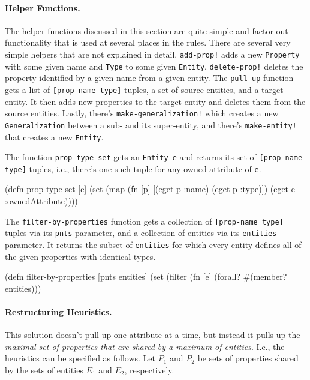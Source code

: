 \documentclass[submission]{eptcs}
\begin{document}
\paragraph{Helper Functions.}

The helper functions discussed in this section are quite simple and factor out
functionality that is used at several places in the rules.  There are several
very simple helpers that are not explained in detail.  \verb|add-prop!| adds a
new \verb|Property| with some given name and \verb|Type| to some given
\verb|Entity|.  \verb|delete-prop!| deletes the property identified by a given
name from a given entity.  The \verb|pull-up| function gets a list of
\verb|[prop-name type]| tuples, a set of source entities, and a target entity.
It then adds new properties to the target entity and deletes them from the
source entities.  Lastly, there's \verb|make-generalization!| which creates a
new \verb|Generalization| between a sub- and its super-entity, and there's
\verb|make-entity!| that creates a new \verb|Entity|.

The function \verb|prop-type-set| gets an \verb|Entity e| and returns its set
of \verb|[prop-name type]| tuples, i.e., there's one such tuple for any owned
attribute of \verb|e|.

\begin{clojurecode}
(defn prop-type-set [e]
  (set (map (fn [p] [(eget p :name) (eget p :type)])
            (eget e :ownedAttribute))))
\end{clojurecode}

The \verb|filter-by-properties| function gets a collection of
\verb|[prop-name type]| tuples via its \verb|pnts| parameter, and a collection
of entities via its \verb|entities| parameter.  It returns the subset of
\verb|entities| for which every entity defines all of the given properties with
identical types.

\begin{clojurecode}
(defn filter-by-properties [pnts entities]
  (set (filter (fn [e] (forall? #(member? %
               entities)))
\end{clojurecode}


\paragraph{Restructuring Heuristics.}

This solution doesn't pull up one attribute at a time, but instead it pulls up
the \emph{maximal set of properties that are shared by a maximum of entities}.
I.e., the heuristics can be specified as follows.  Let $P_1$ and $P_2$ be sets
of properties shared by the sets of entities $E_1$ and $E_2$, respectively.
\end{document}
